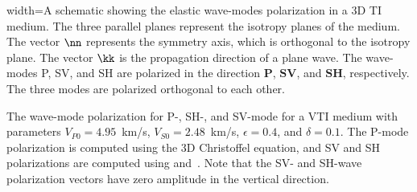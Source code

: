 {width=\textwidth}{A schematic showing the elastic wave-modes
polarization in a 3D TI medium. The three parallel planes represent
the isotropy planes of the medium. The vector $\nn$ represents the
symmetry axis, which is orthogonal to the isotropy plane. The vector
$\kk$ is the propagation direction of a plane wave. The wave-modes P, SV,
and SH are polarized in the direction ${\mathbf P}$, ${\mathbf {SV}}$,
and ${\mathbf {SH}}$, respectively. The three modes are polarized orthogonal
to each other.}



{The wave-mode polarization for P-, SH-, and SV-mode for a VTI medium
with parameters $V_{P0}=4.95$~km/s, $V_{S0}=2.48$~km/s,
$\epsilon=0.4$, and $\delta=0.1$. The P-mode polarization is computed
using the 3D Christoffel equation, and SV and SH polarizations are
computed using  and~. Note that the SV- and
SH-wave polarization vectors have zero amplitude in the vertical
direction.}

